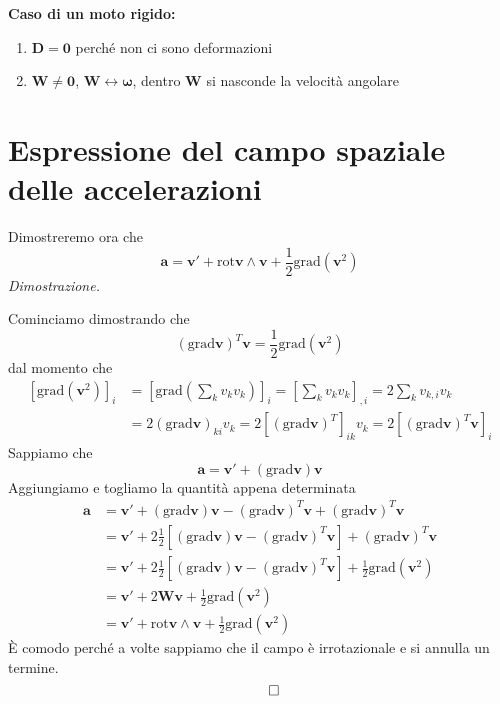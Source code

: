 \documentclass[10pt,a4paper,twoside]{book}
\begin{document}
\textbf{Caso di un moto rigido:}
\begin{enumerate}
\item $\mathbf{D} =\mathbf{0}$ perché non ci sono deformazioni
\item $\mathbf{W} \neq \mathbf{0}$, $\mathbf{W} \leftrightarrow \mathbf{\omega }$, dentro $\mathbf{W}$ si nasconde la velocità angolare
\end{enumerate}
\section{Espressione del campo spaziale delle accelerazioni}

Dimostreremo ora che
\begin{equation*}
\boxed{\mathbf{a} =\mathbf{v} '+\mathrm{rot}\mathbf{v} \land \mathbf{v} +\frac{1}{2}\mathrm{grad}\left(\mathbf{v}^{2}\right)}
\end{equation*}
\textit{Dimostrazione.}

Cominciamo dimostrando che
\begin{equation*}
(\mathrm{grad}\mathbf{v})^{T}\mathbf{v} =\frac{1}{2}\mathrm{grad}\left(\mathbf{v}^{2}\right)
\end{equation*}
dal momento che
\begin{align*}
\left[\mathrm{grad}\left(\mathbf{v}^{2}\right)\right]_{i} & =\left[\mathrm{grad}\left(\sum\limits _{k} v_{k} v_{k}\right)\right]_{i} =\left[\sum\limits _{k} v_{k} v_{k}\right]_{,i} =2\sum\limits _{k} v_{k,i} v_{k}\\
 & =2(\mathrm{grad}\mathbf{v})_{ki} v_{k} =2\left[(\mathrm{grad}\mathbf{v})^{T}\right]_{ik} v_{k} =2\left[(\mathrm{grad}\mathbf{v})^{T}\mathbf{v}\right]_{i}
\end{align*}
Sappiamo che
\begin{equation*}
\mathbf{a} =\mathbf{v} '+(\mathrm{grad}\mathbf{v})\mathbf{v}
\end{equation*}
Aggiungiamo e togliamo la quantità appena determinata
\begin{align*}
\mathbf{a} & =\mathbf{v} '+(\mathrm{grad}\mathbf{v})\mathbf{v} -(\mathrm{grad}\mathbf{v})^{T}\mathbf{v} +(\mathrm{grad}\mathbf{v})^{T}\mathbf{v}\\
 & =\mathbf{v} '+2\frac{1}{2}\left[(\mathrm{grad}\mathbf{v})\mathbf{v} -(\mathrm{grad}\mathbf{v})^{T}\mathbf{v}\right] +(\mathrm{grad}\mathbf{v})^{T}\mathbf{v}\\
 & =\mathbf{v} '+2\frac{1}{2}\left[(\mathrm{grad}\mathbf{v})\mathbf{v} -(\mathrm{grad}\mathbf{v})^{T}\mathbf{v}\right] +\frac{1}{2}\mathrm{grad}\left(\mathbf{v}^{2}\right)\\
 & =\mathbf{v} '+2\mathbf{Wv} +\frac{1}{2}\mathrm{grad}\left(\mathbf{v}^{2}\right)\\
 & =\mathbf{v} '+\mathrm{rot}\mathbf{v} \land \mathbf{v} +\frac{1}{2}\mathrm{grad}\left(\mathbf{v}^{2}\right)
\end{align*}
È comodo perché a volte sappiamo che il campo è irrotazionale e si annulla un termine.
\begin{equation*}
\qed 
\end{equation*}
\end{document}
